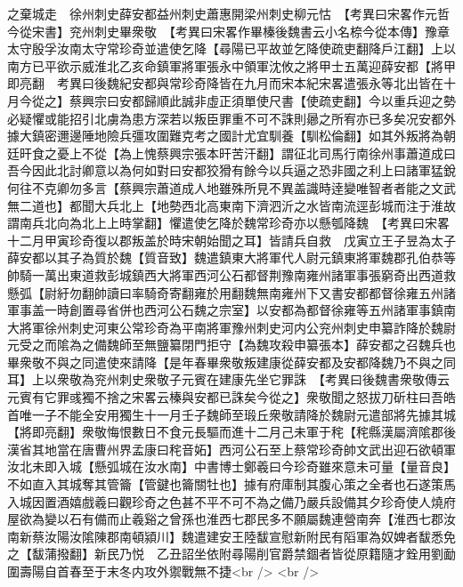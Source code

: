 之棄城走　徐州刺史薛安都益州刺史蕭惠開梁州刺史柳元怙　【考異曰宋畧作元哲今從宋書】兖州刺史畢衆敬　【考異曰宋畧作畢榛後魏書云小名㮈今從本傳】豫章太守殷孚汝南太守常珍奇並遣使乞降【尋陽已平故並乞降使疏吏翻降戶江翻】上以南方已平欲示威淮北乙亥命鎮軍將軍張永中領軍沈攸之將甲士五萬迎薛安都【將甲即亮翻　考異曰後魏紀安都與常珍奇降皆在九月而宋本紀宋畧遣張永等北出皆在十月今從之】蔡興宗曰安都歸順此誠非虛正須單使尺書【使疏吏翻】今以重兵迎之勢必疑懼或能招引北虜為患方深若以叛臣罪重不可不誅則曏之所宥亦已多矣况安都外據大鎮密邇邊陲地險兵彊攻圍難克考之國計尤宜馴養【馴松倫翻】如其外叛將為朝廷旰食之憂上不從【為上愧蔡興宗張本旰苦汗翻】謂征北司馬行南徐州事蕭道成曰吾今因此北討卿意以為何如對曰安都狡猾有餘今以兵逼之恐非國之利上曰諸軍猛銳何往不克卿勿多言【蔡興宗蕭道成人地雖殊所見不異盖識時逹變唯智者者能之文武無二道也】都聞大兵北上【地勢西北高東南下濟泗沂之水皆南流逕彭城而注于淮故謂南兵北向為北上上時掌翻】懼遣使乞降於魏常珍奇亦以懸瓠降魏　【考異曰宋畧十二月甲寅珍奇復以郡叛盖於時宋朝始聞之耳】皆請兵自救　戊寅立王子昱為太子　薛安都以其子為質於魏【質音致】魏遣鎮東大將軍代人尉元鎮東將軍魏郡孔伯恭等帥騎一萬出東道救彭城鎮西大將軍西河公石都督荆豫南雍州諸軍事張窮奇出西道救懸弧【尉紆勿翻帥讀曰率騎奇寄翻雍於用翻魏無南雍州下又書安都都督徐雍五州諸軍事盖一時創置尋省併也西河公石魏之宗室】以安都為都督徐雍等五州諸軍事鎮南大將軍徐州刺史河東公常珍奇為平南將軍豫州刺史河内公兖州刺史申纂詐降於魏尉元受之而隂為之備魏師至無鹽纂閉門拒守【為魏攻殺申纂張本】薛安都之召魏兵也畢衆敬不與之同遣使來請降【是年春畢衆敬叛建康從薛安都及安都降魏乃不與之同耳】上以衆敬為兖州刺史衆敬子元賓在建康先坐它罪誅　【考異曰後魏書衆敬傳云元賓有它罪彧獨不捨之宋畧云榛與安都已誅矣今從之】衆敬聞之怒拔刀斫柱曰吾皓首唯一子不能全安用獨生十一月壬子魏師至瑖丘衆敬請降於魏尉元遣部將先據其城【將即亮翻】衆敬悔恨數日不食元長驅而進十二月己未軍于秺【秺縣漢屬濟隂郡後漢省其地當在唐曹州界孟康曰秺音妬】西河公石至上蔡常珍奇帥文武出迎石欲頓軍汝北未即入城【懸弧城在汝水南】中書博士鄭羲曰今珍奇雖來意未可量【量音良】不如直入其城奪其管籥【管鍵也籥關牡也】據有府庫制其腹心策之全者也石遂策馬入城因置酒嬉戲羲曰觀珍奇之色甚不平不可不為之備乃嚴兵設備其夕珍奇使人燒府屋欲為變以石有備而止羲谿之曾孫也淮西七郡民多不願屬魏連營南奔【淮西七郡汝南新蔡汝陽汝隂陳郡南頓潁川】魏遣建安王陸馛宣慰新附民有䧟軍為奴婢者馛悉免之【馛蒲撥翻】新民乃悦　乙丑詔坐依附尋陽削官爵禁錮者皆從原籍隨才銓用劉勔圍壽陽自首春至于末冬内攻外禦戰無不捷<br />
<br />
